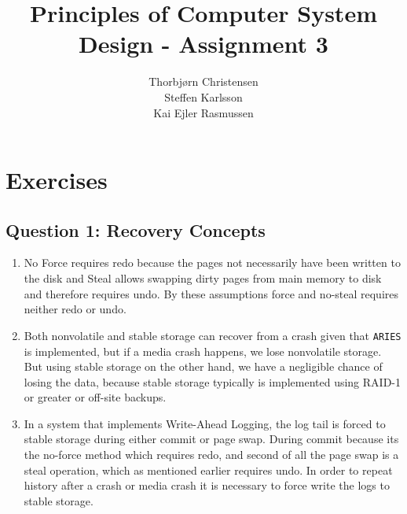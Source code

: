 \documentclass[10pt,a4paper]{article}
\author{Thorbjørn Christensen \\
Steffen Karlsson \\
Kai Ejler Rasmussen}
\title{Principles of Computer System Design - Assignment 3}
\begin{document}
\maketitle

\section*{Exercises}
\subsection*{Question 1: Recovery Concepts}
\begin{enumerate}
	\item No Force requires redo because the pages not necessarily have been written to the disk and Steal allows swapping dirty pages from main memory to disk and therefore requires undo. By these assumptions force and no-steal requires neither redo or undo.
	\item Both nonvolatile and stable storage can recover from a crash given that \texttt{ARIES} is implemented, but if a media crash happens, we lose nonvolatile storage. But using stable storage on the other hand, we have a negligible chance of losing the data, because stable storage typically is implemented using RAID-1 or greater or off-site backups.
	\item In a system that implements Write-Ahead Logging, the log tail is forced to stable storage during either commit or page swap. During commit because its the no-force method which requires redo, and second of all the page swap is a steal operation, which as mentioned earlier requires undo. In order to repeat history after a crash or media crash it is necessary to force write the logs to stable storage.
\end{enumerate}
\end{document}
